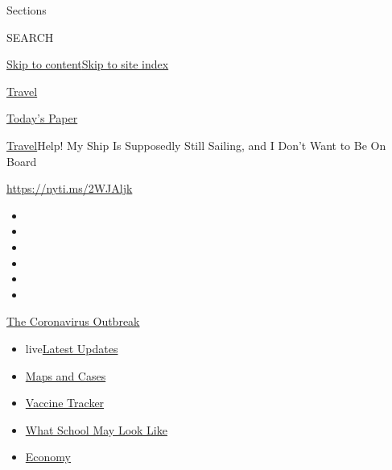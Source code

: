 Sections

SEARCH

\protect\hyperlink{site-content}{Skip to
content}\protect\hyperlink{site-index}{Skip to site index}

\href{https://www.nytimes.com/section/travel}{Travel}

\href{https://myaccount.nytimes.com/auth/login?response_type=cookie\&client_id=vi}{}

\href{https://www.nytimes.com/section/todayspaper}{Today's Paper}

\href{/section/travel}{Travel}\textbar{}Help! My Ship Is Supposedly
Still Sailing, and I Don't Want to Be On Board

\url{https://nyti.ms/2WJAljk}

\begin{itemize}
\item
\item
\item
\item
\item
\item
\end{itemize}

\href{https://www.nytimes.com/news-event/coronavirus?action=click\&pgtype=Article\&state=default\&region=TOP_BANNER\&context=storylines_menu}{The
Coronavirus Outbreak}

\begin{itemize}
\tightlist
\item
  live\href{https://www.nytimes.com/2020/08/01/world/coronavirus-covid-19.html?action=click\&pgtype=Article\&state=default\&region=TOP_BANNER\&context=storylines_menu}{Latest
  Updates}
\item
  \href{https://www.nytimes.com/interactive/2020/us/coronavirus-us-cases.html?action=click\&pgtype=Article\&state=default\&region=TOP_BANNER\&context=storylines_menu}{Maps
  and Cases}
\item
  \href{https://www.nytimes.com/interactive/2020/science/coronavirus-vaccine-tracker.html?action=click\&pgtype=Article\&state=default\&region=TOP_BANNER\&context=storylines_menu}{Vaccine
  Tracker}
\item
  \href{https://www.nytimes.com/interactive/2020/07/29/us/schools-reopening-coronavirus.html?action=click\&pgtype=Article\&state=default\&region=TOP_BANNER\&context=storylines_menu}{What
  School May Look Like}
\item
  \href{https://www.nytimes.com/live/2020/07/31/business/stock-market-today-coronavirus?action=click\&pgtype=Article\&state=default\&region=TOP_BANNER\&context=storylines_menu}{Economy}
\end{itemize}

